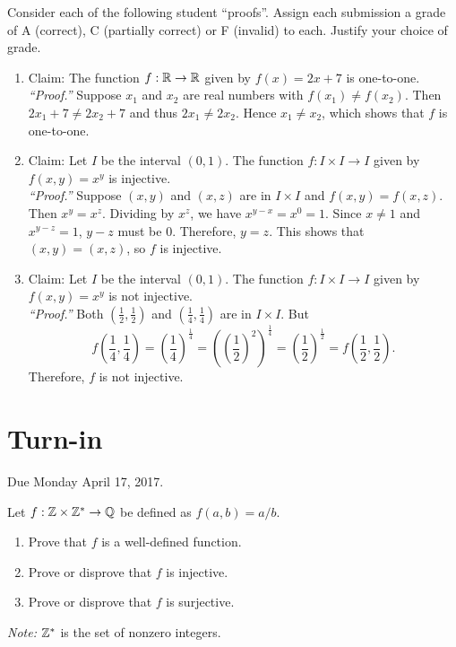 \documentclass[12pt]{article}
\begin{document}
\begin{qu}
Consider each of the following student ``proofs''. Assign each submission a grade of A (correct), C (partially correct) or F (invalid) to each. Justify your choice of grade.
\begin{enumerate}[label=\alph*)]
\item Claim: The function $f: \mathbb R \to \mathbb R$ given by $f(x)=2x+7$ is one-to-one. \\
\emph{``Proof.''} Suppose $x_1$ and $x_2$ are real numbers with $f(x_1)\ne f(x_2)$. Then $2x_1+7\ne 2x_2+7$ and thus $2x_1 \ne 2x_2$. Hence $x_1 \ne x_2$, which shows that $f$ is one-to-one.
\item Claim: Let $I$ be the interval $(0,1)$. The function $f:I \times I \to I$ given by $f(x,y)=x^y$ is injective. \\
\emph{``Proof.''} Suppose $(x,y)$ and $(x,z)$ are in $I \times I$ and $f(x,y)=f(x,z)$. Then $x^y=x^z$. Dividing by $x^z$, we have $x^{y-x}=x^0=1$. Since $x \ne 1$ and $x^{y-z}=1$, $y-z$ must be 0. Therefore, $y=z$. This shows that $(x,y)=(x,z)$, so $f$ is injective.
\item Claim: Let $I$ be the interval $(0,1)$. The function $f:I \times I \to I$ given by $f(x,y)=x^y$ is not injective. \\
\emph{``Proof.''}  Both $\left(\frac{1}{2}, \frac{1}{2}\right)$ and $\left(\frac{1}{4}, \frac{1}{4}\right)$ are in $I \times I$. But
$$f\left(\frac{1}{4}, \frac{1}{4}\right) = \left(\frac{1}{4}\right)^\frac{1}{4} =\left( \left(\frac{1}{2} \right)^2 \right) ^\frac{1}{4}=\left(\frac{1}{2} \right)^\frac{1}{2}=f\left(\frac{1}{2}, \frac{1}{2}\right).$$
Therefore, $f$ is not injective.
\end{enumerate}
\end{qu}
\newpage
\section{Turn-in} 

Due Monday April 17, 2017.


\begin{qu}
Let $f: \mathbb Z \times \mathbb Z^\ast \to \mathbb Q$ be defined as $f(a,b)=a/b$. 
\begin{enumerate}[label=\alph*)]
\item Prove that $f$ is a well-defined function.
\item Prove or disprove that $f$ is injective.
\item Prove or disprove that $f$ is surjective.
\end{enumerate}

\emph{Note:} $\mathbb Z^\ast$ is the set of nonzero integers.
\end{qu}
\end{document}
